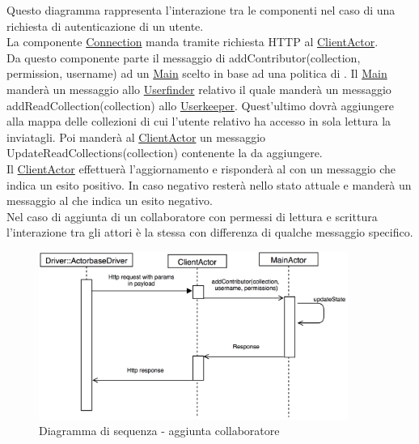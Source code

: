 \documentclass{scalatekids-article}
\begin{document}
Questo diagramma rappresenta l'interazione tra le componenti nel caso di una richiesta di autenticazione di un utente.\\
La componente \hyperref[sec:actorbase::driver::client::Connection]{Connection}
manda tramite richiesta HTTP al \hyperref[sec:actorbase::actorsystem::actors::clientactor::ClientActor]{ClientActor}.\\
Da questo componente parte il messaggio di addContributor(collection, permission, username) ad un
\hyperref[sec:actorbase::actorsystem::actors::main::Main]{Main} scelto in base ad una
politica di . Il \hyperref[sec:actorbase::actorsystem::actors::main::Main]{Main} manderà un messaggio allo
\hyperref[sec:actorbase::actorsystem::actors::userfinder]{Userfinder}
relativo il quale manderà un messaggio addReadCollection(collection) allo
\hyperref[sec:actorbase::actorsystem::actors::userkeeper::Userkeeper]{Userkeeper}.
Quest'ultimo dovrà aggiungere alla mappa delle collezioni di cui l'utente
relativo ha accesso in sola lettura la  inviatagli.
Poi manderà al \hyperref[sec:actorbase::actorsystem::actors::clientactor::ClientActor]{ClientActor} un messaggio UpdateReadCollections(collection)
contenente la  da aggiungere.\\
Il \hyperref[sec:actorbase::actorsystem::actors::clientactor::ClientActor]{ClientActor} effettuerà l'aggiornamento e risponderà al 
con un messaggio che indica un esito positivo. In caso negativo resterà nello
stato attuale e manderà un messaggio al  che indica un esito
negativo.\\ Nel caso di aggiunta di un collaboratore con permessi di lettura e scrittura
l'interazione tra gli attori è la stessa con differenza di qualche messaggio
specifico.\\
\begin{figure}[H]
  \begin{center}
    \includegraphics[width=0.9\textwidth, keepaspectratio]{img/diagrammiSequenza/esempioAddContributor.png}
    \caption{Diagramma di sequenza - aggiunta collaboratore}
  \end{center}
\end{figure}
\end{document}
